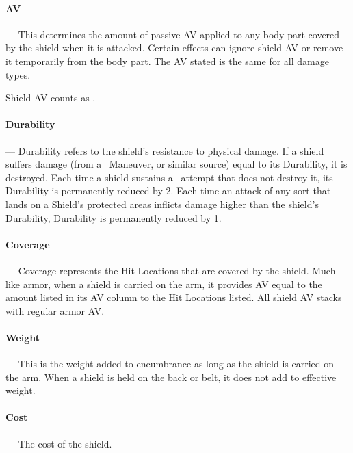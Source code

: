 \documentclass[oneside,11pt,english]{book}
\begin{document}
\vspace{-10pt}\paragraph{AV}---\quad
This determines the amount of passive AV applied to any body part covered by the shield when it is attacked. Certain effects can ignore shield AV or remove it temporarily from the body part. The AV 
stated is the same for all damage types.

Shield AV counts as .

\vspace{-10pt}\paragraph{Durability}---\quad
Durability refers to the shield’s resistance to physical damage. If a shield suffers damage (from a ~Maneuver, or similar source) equal to its Durability, it is destroyed. Each time a shield sustains a ~attempt that does not destroy it, its Durability is permanently reduced by 2. Each time an attack of any 
sort that lands on a Shield’s protected areas inflicts damage higher than the shield's Durability, Durability 
is permanently reduced by 1.

\vspace{-10pt}\paragraph{Coverage} ---\quad
Coverage represents the Hit Locations that are covered by the shield. Much like armor, when a shield is 
carried on the arm, it provides AV equal to the amount listed in its AV column to the Hit Locations listed. 
All shield AV stacks with regular armor AV. 

\vspace{-10pt}\paragraph{Weight}---\quad
This is the weight added to encumbrance as long as the shield is carried on the arm. When a shield is held 
on the back or belt, it does not add to effective weight. 

\vspace{-10pt}\paragraph{Cost}---\quad
The cost of the shield.
\newpage
\end{document}
